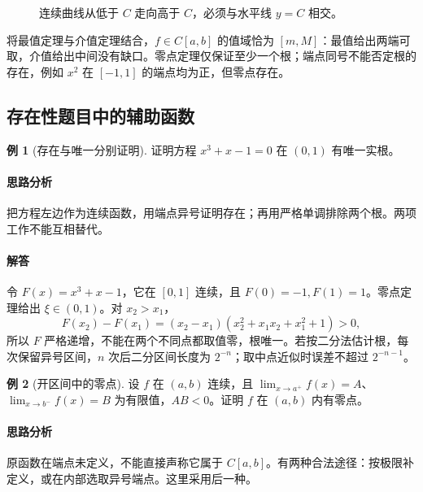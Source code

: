 \documentclass[UTF8,fontset=fandol,12pt,oneside,openany]{ctexrep}
\theoremstyle{definition}
\newtheorem{example}{例}[chapter]
\begin{document}
\begin{figure}[htbp]
\centering
{}
\caption{连续曲线从低于 $C$ 走向高于 $C$，必须与水平线 $y=C$ 相交。}
\label{lec:04:fig-ivt}
\end{figure}

将最值定理与介值定理结合，$f\in C[a,b]$ 的值域恰为 $[m,M]$：最值给出两端可取，介值给出中间没有缺口。零点定理仅保证至少一个根；端点同号不能否定根的存在，例如 $x^2$ 在 $[-1,1]$ 的端点均为正，但零点存在。

\subsection{存在性题目中的辅助函数}
\begin{example}[存在与唯一分别证明]
证明方程 $x^3+x-1=0$ 在 $(0,1)$ 有唯一实根。
\end{example}
\paragraph{思路分析}
把方程左边作为连续函数，用端点异号证明存在；再用严格单调排除两个根。两项工作不能互相替代。
\paragraph{解答}
令 $F(x)=x^3+x-1$，它在 $[0,1]$ 连续，且 $F(0)=-1,F(1)=1$。零点定理给出 $\xi\in(0,1)$。对 $x_2>x_1$，
\[
 F(x_2)-F(x_1)=(x_2-x_1)(x_2^2+x_1x_2+x_1^2+1)>0,
\]
所以 $F$ 严格递增，不能在两个不同点都取值零，根唯一。若按二分法估计根，每次保留异号区间，$n$ 次后二分区间长度为 $2^{-n}$；取中点近似时误差不超过 $2^{-n-1}$。

\begin{example}[开区间中的零点]
设 $f$ 在 $(a,b)$ 连续，且 $\lim_{x\to a^+}f(x)=A$、$\lim_{x\to b^-}f(x)=B$ 为有限值，$AB<0$。证明 $f$ 在 $(a,b)$ 内有零点。
\end{example}
\paragraph{思路分析}
原函数在端点未定义，不能直接声称它属于 $C[a,b]$。有两种合法途径：按极限补定义，或在内部选取异号端点。这里采用后一种。
\end{document}
